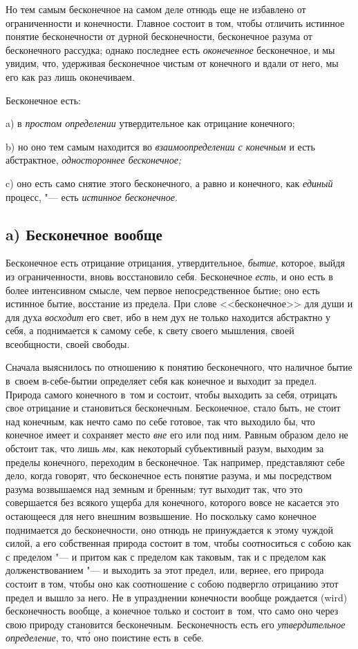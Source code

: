 Но тем самым бесконечное на самом деле отнюдь еще не избавлено от
ограниченности и конечности. Главное состоит в том, чтобы отличить истинное
понятие бесконечности от дурной бесконечности, бесконечное разума от
бесконечного рассудка; однако последнее есть {\em оконеченное} бесконечное, и
мы увидим, что, удерживая бесконечное чистым от конечного и вдали от него, мы
его как раз лишь оконечиваем.

Бесконечное есть:

a) в {\em простом определении} утвердительное как отрицание конечного;

b) но оно тем самым находится во {\em взаимоопределении
с конечным} и есть абстрактное, {\em одностороннее бесконечное;}

c) оно есть само снятие этого бесконечного, а равно и конечного, как
{\em единый} процесс, "--- есть {\em истинное бесконечное}.

\subsection[a) Бесконечное вообще]{a) Бесконечное вообще}

Бесконечное есть отрицание отрицания, утвердительное,
{\em бытие}, которое, выйдя из ограниченности, вновь
восстановило себя. Бесконечное {\em есть}, и оно есть в
более интенсивном смысле, чем первое непосредственное бытие; оно есть
истинное бытие, восстание из предела. При слове <<бесконечное>> для души и
для духа {\em восходит} его свет, ибо в нем дух не
только находится абстрактно у себя, а поднимается к самому себе, к свету
своего мышления, своей всеобщности, своей свободы.

Сначала выяснилось по отношению к понятию бесконечного, что наличное бытие
в~своем в-себе-бытии определяет себя как конечное и выходит за предел. Природа
самого конечного в~том и состоит, чтобы выходить за себя, отрицать свое
отрицание и становиться бесконечным. Бесконечное, стало быть, не стоит над
конечным, как нечто само по себе готовое, так что выходило бы, что конечное
имеет и сохраняет место {\em вне} его или под ним. Равным образом дело не
обстоит так, что лишь {\em мы}, как некоторый субъективный разум, выходим за
пределы конечного, переходим в бесконечное. Так например, представляют себе
дело, когда говорят, что бесконечное есть понятие разума, и мы посредством
разума возвышаемся над земным и бренным; тут выходит так, что это совершается
без всякого ущерба для конечного, которого вовсе не касается это остающееся для
него внешним возвышение. Но поскольку само конечное поднимается до
бесконечности, оно отнюдь не принуждается к этому чуждой силой, а его
собственная природа состоит в том, чтобы соотноситься с собою как с пределом
"--- и притом как с пределом как таковым, так и с пределом как долженствованием
"--- и выходить за этот предел, или, вернее, его природа состоит в том, чтобы
оно как соотношение с собою подвергло отрицанию этот предел и вышло за него. Не
в упразднении конечности вообще рождается (wird) бесконечность вообще, а
конечное только и состоит в~том, что само оно через свою природу становится
бесконечным. Бесконечность есть его {\em утвердительное определение},
то, чт\'{о} оно поистине есть в~себе.

